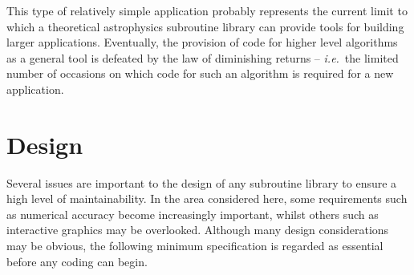 \begin {description}
This type of relatively simple application probably represents the current
limit to which a theoretical astrophysics subroutine library can provide 
tools for building larger applications. 
Eventually, the provision of code for higher level algorithms as a general 
tool is defeated by the law of diminishing returns -- {\em i.e.}\ the 
limited number of occasions on which code for such an algorithm is required 
for a new application.
\end {description}

\section {Design}
Several issues are important to the design of any subroutine library to 
ensure a high level of maintainability. 
In the area considered here, some requirements such as numerical accuracy 
become increasingly important, whilst others such as interactive 
graphics may be overlooked. 
Although many design considerations may be obvious, the following minimum 
specification is regarded as essential before any coding can begin.

